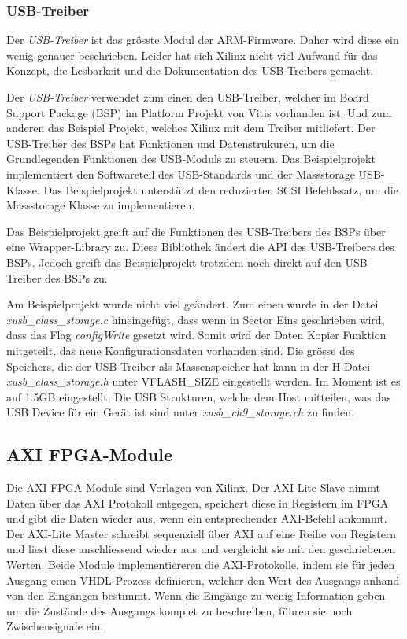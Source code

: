 \subsubsection*{USB-Treiber}
Der \textit{USB-Treiber} ist das grösste Modul der ARM-Firmware. Daher wird diese ein wenig genauer beschrieben. Leider hat sich Xilinx nicht viel Aufwand für das Konzept, die Lesbarkeit und die Dokumentation des USB-Treibers gemacht.

Der \textit{USB-Treiber} verwendet zum einen den USB-Treiber, welcher im Board Support Package (BSP) im Platform Projekt von Vitis vorhanden ist. Und zum anderen das Beispiel Projekt, welches Xilinx mit dem Treiber mitliefert. Der USB-Treiber des BSPs hat Funktionen und Datenstrukuren, um die Grundlegenden Funktionen des USB-Moduls zu steuern. Das Beispielprojekt implementiert den Softwareteil des USB-Standards und der Massstorage USB-Klasse. Das Beispielprojekt unterstützt den reduzierten SCSI Befehlssatz, um die Massstorage Klasse zu implementieren.

Das Beispielprojekt greift auf die Funktionen des USB-Treibers des BSPs über eine Wrapper-Library zu. Diese Bibliothek ändert die API des USB-Treibers des BSPs. Jedoch greift das Beispielprojekt trotzdem noch direkt auf den USB-Treiber des BSPs zu. 

Am Beispielprojekt wurde nicht viel geändert. Zum einen wurde in der Datei \textit{xusb\_class\_\-storage.c} hineingefügt, dass wenn in Sector Eins geschrieben wird, dass das Flag \textit{configWrite} gesetzt wird. Somit wird der Daten Kopier Funktion mitgeteilt, das neue Konfigurationsdaten vorhanden sind. Die grösse des Speichers, die der USB-Treiber als Massenspeicher hat kann in der H-Datei \textit{xusb\_class\_storage.h} unter VFLASH\_SIZE eingestellt werden. Im Moment ist es auf 1.5GB eingestellt.
Die USB Strukturen, welche dem Host mitteilen, was das USB Device für ein Gerät ist sind unter \textit{xusb\_ch9\_storage.ch} zu finden.

\subsection{AXI FPGA-Module}
\label{sec:axi}
Die AXI FPGA-Module sind Vorlagen von Xilinx. Der AXI-Lite Slave nimmt Daten über das AXI Protokoll entgegen, speichert diese in Registern im FPGA und gibt die Daten wieder aus, wenn ein entsprechender AXI-Befehl ankommt. Der AXI-Lite Master schreibt sequenziell über AXI auf eine Reihe von Registern und liest diese anschliessend wieder aus und vergleicht sie mit den geschriebenen Werten. Beide Module implementiereren die AXI-Protokolle, indem sie für jeden Ausgang einen VHDL-Prozess definieren, welcher den Wert des Ausgangs anhand von den Eingängen bestimmt. Wenn die Eingänge zu wenig Information geben um die Zustände des Ausgangs komplet zu beschreiben, führen sie noch Zwischensignale ein.


